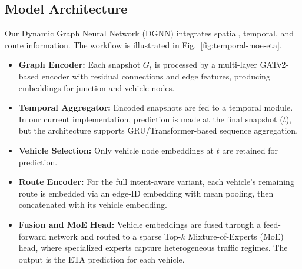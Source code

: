 \subsection{Model Architecture}
Our Dynamic Graph Neural Network (DGNN) integrates spatial, temporal, and route information. 
The workflow is illustrated in Fig.~\ref{fig:temporal-moe-eta}.

\begin{itemize}
    \item \textbf{Graph Encoder:} Each snapshot $G_t$ is processed by a multi-layer GATv2-based encoder with residual connections and edge features, producing embeddings for junction and vehicle nodes.
    \item \textbf{Temporal Aggregator:} Encoded snapshots are fed to a temporal module. In our current implementation, prediction is made at the final snapshot ($t$), but the architecture supports GRU/Transformer-based sequence aggregation.
    \item \textbf{Vehicle Selection:} Only vehicle node embeddings at $t$ are retained for prediction.
    \item \textbf{Route Encoder:} For the full intent-aware variant, each vehicle’s remaining route is embedded via an edge-ID embedding with mean pooling, then concatenated with its vehicle embedding.
    \item \textbf{Fusion and MoE Head:} Vehicle embeddings are fused through a feed-forward network and routed to a sparse Top-$k$ Mixture-of-Experts (MoE) head, where specialized experts capture heterogeneous traffic regimes. The output is the ETA prediction for each vehicle.
\end{itemize}


